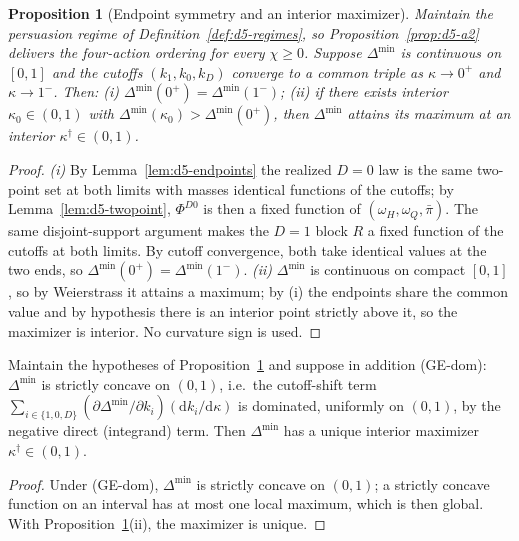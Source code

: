\documentclass[11pt]{article}
\newtheorem{proposition}{Proposition}
\newcommand{\1}{\mathbf{1}}
\begin{document}
\begin{proposition}[Endpoint symmetry and an interior maximizer]\label{prop:d5-peak}
Maintain the persuasion regime of Definition~\ref{def:d5-regimes}, so Proposition~\ref{prop:d5-a2} delivers the four-action ordering for every $\chi\ge0$. Suppose $\Delta^{\min}$ is continuous on $[0,1]$ and the cutoffs $(k_1,k_0,k_D)$ converge to a common triple as $\kappa\to0^+$ and $\kappa\to1^-$. Then: \textnormal{(i)} $\Delta^{\min}(0^+)=\Delta^{\min}(1^-)$; \textnormal{(ii)} if there exists interior $\kappa_0\in(0,1)$ with $\Delta^{\min}(\kappa_0)>\Delta^{\min}(0^+)$, then $\Delta^{\min}$ attains its maximum at an interior $\kappa^{\dagger}\in(0,1)$.
\end{proposition}
\begin{proof}
\emph{(i)} By Lemma~\ref{lem:d5-endpoints} the realized $D=0$ law is the same two-point set at both limits with masses identical functions of the cutoffs; by Lemma~\ref{lem:d5-twopoint}, $\Phi^{D0}$ is then a fixed function of $(\omega_H,\omega_Q,\bar\pi)$. The same disjoint-support argument makes the $D=1$ block $R$ a fixed function of the cutoffs at both limits. By cutoff convergence, both take identical values at the two ends, so $\Delta^{\min}(0^+)=\Delta^{\min}(1^-)$. \emph{(ii)} $\Delta^{\min}$ is continuous on compact $[0,1]$, so by Weierstrass it attains a maximum; by (i) the endpoints share the common value and by hypothesis there is an interior point strictly above it, so the maximizer is interior. No curvature sign is used.
\end{proof}

\begin{namedclaim}\label{claim:d5-singlepeak}
Maintain the hypotheses of Proposition~\ref{prop:d5-peak} and suppose in addition \textnormal{(GE-dom)}: $\Delta^{\min}$ is strictly concave on $(0,1)$, i.e.\ the cutoff-shift term $\sum_{i\in\{1,0,D\}}(\partial\Delta^{\min}/\partial k_i)(\mathrm d k_i/\mathrm d\kappa)$ is dominated, uniformly on $(0,1)$, by the negative direct (integrand) term. Then $\Delta^{\min}$ has a unique interior maximizer $\kappa^{\dagger}\in(0,1)$.
\end{namedclaim}
\begin{proof}
Under (GE-dom), $\Delta^{\min}$ is strictly concave on $(0,1)$; a strictly concave function on an interval has at most one local maximum, which is then global. With Proposition~\ref{prop:d5-peak}(ii), the maximizer is unique.
\end{proof}
\end{document}
